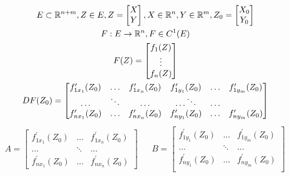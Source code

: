 \documentclass[main]{subfiles}
\begin{document}
      \begin{theorem}
         \begin{gather*}
         E \subset {\vR}^{n+m}, Z \in E, Z = \begin{bmatrix*}
            X \\
            Y
         \end{bmatrix*},
         X \in {\vR}^n, Y \in {\vR}^m, Z_0 = \begin{bmatrix*}
            X_0 \\
            Y_0
         \end{bmatrix*} \\
          F: E \rightarrow {\vR}^n, F \in C^1(E) \\
         F(Z) = \begin{bmatrix*}
            f_1(Z) \\
            \vdots \\
            f_n(Z)
         \end{bmatrix*} \\
         DF(Z_0) = \begin{bmatrix*}
            f^\prime_{1x_1}(Z_0) & \ldots & f^\prime_{1x_n}(Z_0) & f^\prime_{1y_1}(Z_0) & \ldots & f^\prime_{1y_m}(Z_0) \\
            \ldots & \ddots & \ldots & \ldots \ddots & \ldots \\
            f^\prime_{nx_1}(Z_0) & \ldots & f^\prime_{nx_n}(Z_0) & f^\prime_{ny_1}(Z_0) & \ldots & f^\prime_{ny_m}(Z_0) 
         \end{bmatrix*} 
      \end{gather*}
         \begin{align*}
            A = \begin{bmatrix*}
               f^\prime_{1x_1}(Z_0) & \ldots & f^\prime_{1x_n}(Z_0) \\
               \ldots & \ddots & \ldots \\
               f^\prime_{nx_1}(Z_0) & \ldots & f^\prime_{nx_n}(Z_0)
            \end{bmatrix*} && B =
            \begin{bmatrix*}
               f^\prime_{1y_1}(Z_0) & \ldots & f^\prime_{1y_m}(Z_0) \\
               \ldots & \ddots & \ldots \\
               f^\prime_{ny_1}(Z_0) & \ldots & f^\prime_{ny_m}(Z_0) \\
            \end{bmatrix*}
         \end{align*}
 

\end{theorem}
\end{document}
